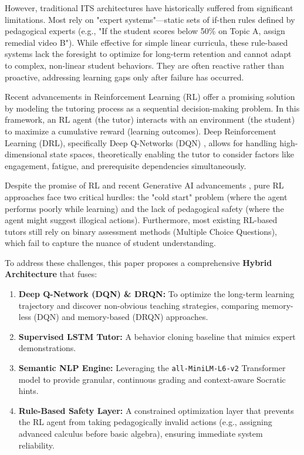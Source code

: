 \documentclass[conference]{IEEEtran}
\begin{document}
However, traditional ITS architectures have historically suffered from significant limitations. Most rely on "expert systems"—static sets of if-then rules defined by pedagogical experts (e.g., "If the student scores below 50\% on Topic A, assign remedial video B"). While effective for simple linear curricula, these rule-based systems lack the foresight to optimize for long-term retention and cannot adapt to complex, non-linear student behaviors. They are often reactive rather than proactive, addressing learning gaps only after failure has occurred.

Recent advancements in Reinforcement Learning (RL) offer a promising solution by modeling the tutoring process as a sequential decision-making problem. In this framework, an RL agent (the tutor) interacts with an environment (the student) to maximize a cumulative reward (learning outcomes). Deep Reinforcement Learning (DRL), specifically Deep Q-Networks (DQN) \cite{mnih2015}, allows for handling high-dimensional state spaces, theoretically enabling the tutor to consider factors like engagement, fatigue, and prerequisite dependencies simultaneously.

Despite the promise of RL and recent Generative AI advancements \cite{kasneci2023}, pure RL approaches face two critical hurdles: the "cold start" problem (where the agent performs poorly while learning) and the lack of pedagogical safety (where the agent might suggest illogical actions). Furthermore, most existing RL-based tutors still rely on binary assessment methods (Multiple Choice Questions), which fail to capture the nuance of student understanding.

To address these challenges, this paper proposes a comprehensive \textbf{Hybrid Architecture} that fuses:
\begin{enumerate}
    \item \textbf{Deep Q-Network (DQN) \& DRQN:} To optimize the long-term learning trajectory and discover non-obvious teaching strategies, comparing memory-less (DQN) and memory-based (DRQN) approaches.
    \item \textbf{Supervised LSTM Tutor:} A behavior cloning baseline that mimics expert demonstrations.
    \item \textbf{Semantic NLP Engine:} Leveraging the \texttt{all-MiniLM-L6-v2} Transformer model to provide granular, continuous grading and context-aware Socratic hints.
    \item \textbf{Rule-Based Safety Layer:} A constrained optimization layer that prevents the RL agent from taking pedagogically invalid actions (e.g., assigning advanced calculus before basic algebra), ensuring immediate system reliability.
\end{enumerate}
\end{document}
